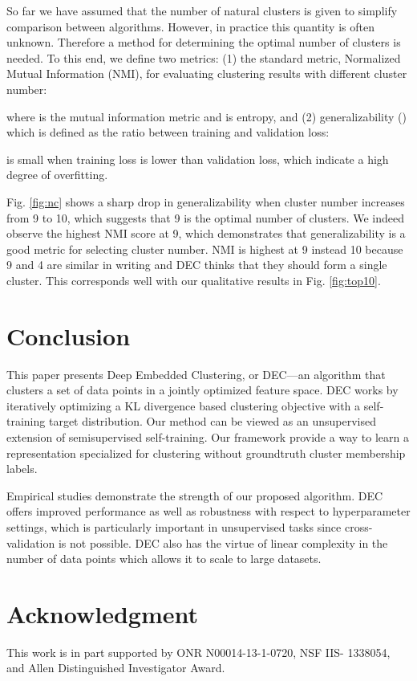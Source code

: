 \documentclass{article}
\begin{document}
So far we have assumed that the number of natural clusters is given to simplify comparison between algorithms.
However, in practice this quantity is often unknown.
Therefore a method for determining the optimal number of clusters is needed.
To this end, we define two metrics: (1) the standard metric, Normalized Mutual Information (NMI), for evaluating clustering results with different cluster number:

where  is the mutual information metric and  is entropy,
and (2) generalizability () which is defined as the ratio between training and validation loss:

 is small when training loss is lower than validation loss, which indicate a high degree of overfitting.

Fig. \ref{fig:nc} shows a sharp drop in generalizability when cluster number increases from 9 to 10, which suggests that 9 is the optimal number of clusters. We indeed observe the highest NMI score at 9, which demonstrates that generalizability is a good metric for selecting cluster number. NMI is highest at 9 instead 10 because 
9 and 4 are similar in writing and DEC thinks that they should form a single cluster. This corresponds well with our qualitative results in Fig. \ref{fig:top10}.


 \section{Conclusion}
This paper presents Deep Embedded Clustering, or DEC---an algorithm that clusters a set of data points in a jointly optimized feature space.
DEC works by iteratively optimizing a KL divergence based clustering objective with a self-training target distribution. Our method can be viewed as an unsupervised extension of semisupervised self-training. Our framework provide a way to learn a representation specialized for clustering without groundtruth cluster membership labels.

Empirical studies demonstrate the strength of our proposed algorithm. DEC offers improved performance as well as robustness with respect to hyperparameter settings, which is particularly important in unsupervised tasks since cross-validation is not possible. DEC also has the virtue of linear complexity in the number of data points which allows it to scale to large datasets. 
\section{Acknowledgment}
This work is in part supported by ONR N00014-13-1-0720, NSF IIS- 1338054, and Allen Distinguished Investigator Award.




\end{document}
